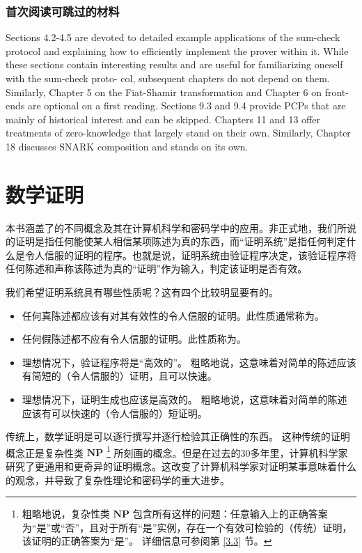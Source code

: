 \subsubsection{首次阅读可跳过的材料} Sections 4.2-4.5 are devoted to detailed example applications of the sum-check protocol and explaining how to efficiently implement the prover within it. While these sections contain interesting results and are useful for familiarizing oneself with the sum-check proto- col, subsequent chapters do not depend on them. Similarly, Chapter 5 on the Fiat-Shamir transformation and Chapter 6 on front-ends are optional on a first reading. Sections 9.3 and 9.4 provide PCPs that are mainly of historical interest and can be skipped.
Chapters 11 and 13 offer treatments of zero-knowledge that largely stand on their own. Similarly, Chapter 18 discusses SNARK composition and stands on its own.



\section{数学证明}
本书涵盖了的不同概念及其在计算机科学和密码学中的应用。非正式地，我们所说的证明是指任何能使某人相信某项陈述为真的东西，而“证明系统”是指任何判定什么是令人信服的证明的程序。也就是说，证明系统由验证程序决定，该验证程序将任何陈述和声称该陈述为真的“证明”作为输入，判定该证明是否有效。

我们希望证明系统具有哪些性质呢？这有四个比较明显要有的。
\begin{itemize}
    \item 任何真陈述都应该有对其有效性的令人信服的证明。此性质通常称为。
    \item 任何假陈述都不应有令人信服的证明。此性质称为。
    \item 理想情况下，验证程序将是“高效的”。 粗略地说，这意味着对简单的陈述应该有简短的（令人信服的）证明，且可以快速。
    \item 理想情况下，证明生成也应该是高效的。 粗略地说，这意味着对简单的陈述应该有可以快速的（令人信服的）短证明。
\end{itemize}


传统上，数学证明是可以逐行撰写并逐行检验其正确性的东西。 这种传统的证明概念正是复杂性类 $\mathbf{N P}$ \footnote{粗略地说，复杂性类 $\mathbf{N P}$ 包含所有这样的问题：任意输入上的正确答案为“是”或“否”，且对于所有“是”实例，存在一个有效可检验的（传统）证明，该证明的正确答案为“是”。 详细信息可参阅第 \ref{3.3} 节。} 所刻画的概念。但是在过去的30多年里，计算机科学家研究了更通用和更奇异的证明概念。这改变了计算机科学家对证明某事意味着什么的观念，并导致了复杂性理论和密码学的重大进步。



